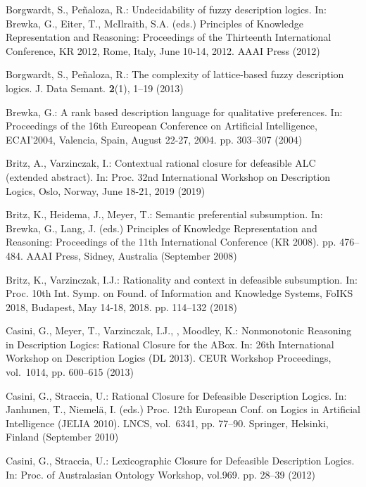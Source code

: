 \documentclass[runningheads]{llncs}
\begin{document}
\begin{thebibliography}{10}
Borgwardt, S., Pe{\~{n}}aloza, R.: Undecidability of fuzzy description logics.
  In: Brewka, G., Eiter, T., McIlraith, S.A. (eds.) Principles of Knowledge
  Representation and Reasoning: Proceedings of the Thirteenth International
  Conference, {KR} 2012, Rome, Italy, June 10-14, 2012. {AAAI} Press (2012)

Borgwardt, S., Pe{\~{n}}aloza, R.: The complexity of lattice-based fuzzy
  description logics. J. Data Semant.  \textbf{2}(1),  1--19 (2013)

Brewka, G.: A rank based description language for qualitative preferences. In:
  Proceedings of the 16th Eureopean Conference on Artificial Intelligence,
  ECAI'2004, Valencia, Spain, August 22-27, 2004. pp. 303--307 (2004)

Britz, A., Varzinczak, I.: Contextual rational closure for defeasible {ALC}
  (extended abstract). In: Proc. 32nd International Workshop on Description
  Logics, Oslo, Norway, June 18-21, 2019 (2019)

Britz, K., Heidema, J., Meyer, T.: Semantic preferential subsumption. In:
  Brewka, G., Lang, J. (eds.) Principles of Knowledge Representation and
  Reasoning: Proceedings of the 11th International Conference (KR 2008). pp.
  476--484. AAAI Press, Sidney, Australia (September 2008)

Britz, K., Varzinczak, I.J.: Rationality and context in defeasible subsumption.
  In: Proc. 10th Int. Symp. on Found. of Information and Knowledge Systems,
  FoIKS 2018, Budapest, May 14-18, 2018. pp. 114--132 (2018)

Casini, G., Meyer, T., Varzinczak, I.J., , Moodley, K.: {Nonmonotonic Reasoning
  in Description Logics: Rational Closure for the ABox}. In: 26th International
  Workshop on Description Logics (DL 2013). CEUR Workshop Proceedings,
  vol.~1014, pp. 600--615 (2013)

Casini, G., Straccia, U.: {Rational Closure for Defeasible Description Logics}.
  In: Janhunen, T., Niemel{\"a}, I. (eds.) Proc. 12th European Conf. on Logics
  in Artificial Intelligence (JELIA 2010). LNCS, vol.~6341, pp. 77--90.
  Springer, Helsinki, Finland (September 2010)

Casini, G., Straccia, U.: {Lexicographic Closure for Defeasible Description
  Logics}. In: Proc. of Australasian Ontology Workshop, vol.969. pp. 28--39
  (2012)


\end{thebibliography}
\end{document}
